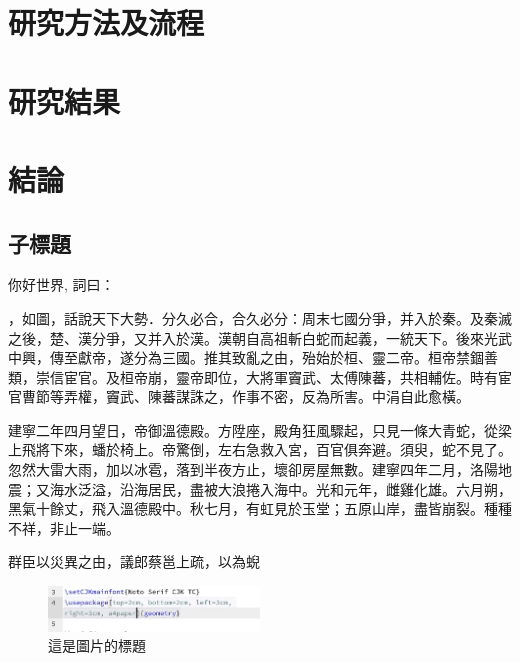\documentclass[12pt]{article}
\begin{document}
\section{研究方法及流程}
\section{研究結果}
\section{結論}
\subsection{子標題}  

\hspace{2em}你好世界, 詞曰：

，如圖，話說天下大勢．分久必合，合久必分：周末七國分爭，并入於秦。及秦滅之後，楚、漢分爭，又并入於漢。漢朝自高祖斬白蛇而起義，一統天下。後來光武中興，傳至獻帝，遂分為三國。推其致亂之由，殆始於桓、靈二帝。桓帝禁錮善類，崇信宦官。及桓帝崩，靈帝即位，大將軍竇武、太傅陳蕃，共相輔佐。時有宦官曹節等弄權，竇武、陳蕃謀誅之，作事不密，反為所害。中涓自此愈橫。

建寧二年四月望日，帝御溫德殿。方陞座，殿角狂風驟起，只見一條大青蛇，從梁上飛將下來，蟠於椅上。帝驚倒，左右急救入宮，百官俱奔避。須臾，蛇不見了。忽然大雷大雨，加以冰雹，落到半夜方止，壞卻房屋無數。建寧四年二月，洛陽地震；又海水泛溢，沿海居民，盡被大浪捲入海中。光和元年，雌雞化雄。六月朔，黑氣十餘丈，飛入溫德殿中。秋七月，有虹見於玉堂；五原山岸，盡皆崩裂。種種不祥，非止一端。




\hspace{2em}群臣以災異之由，議郎蔡邕上疏，以為蜺

\begin{figure}[h]
    \centering
    \renewcommand{\figurename}{圖} %
    \includegraphics[width=0.5\textwidth]{截圖 2025-01-24 03.21.17.png}     %
    \caption{這是圖片的標題}    %
    \label{fig:example2}    %
\end{figure}
\end{document}
